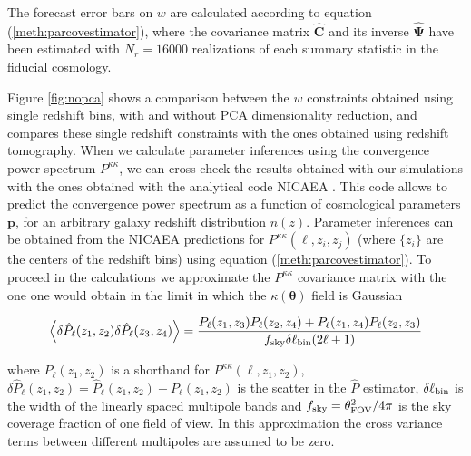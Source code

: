 \documentclass[reprint,aps,prd,superscriptaddress,showkeys,showpacs]{revtex4-1}
\newcommand{\bb}[1]{\mathbf{#1}}
\newcommand{\bbh}[1]{\mathbf{\hat{#1}}}
\newcommand{\h}[1]{\hat{#1}}
\begin{document}
The forecast error bars on $w$ are calculated according to equation (\ref{meth:parcovestimator}), where the covariance matrix $\bbh{C}$ and its inverse $\bbh{\Psi}$ have been estimated with $N_r=16000$ realizations of each summary statistic in the fiducial cosmology.

Figure \ref{fig:nopca} shows a comparison between the $w$ constraints obtained using single redshift bins, with and without PCA dimensionality reduction, and compares these single redshift constraints with the ones obtained using redshift tomography. When we calculate parameter inferences using the convergence power spectrum $P^{\kappa\kappa}$, we can cross check the results obtained with our simulations with the ones obtained with the analytical code NICAEA \citep{Nicaea}. This code allows to predict the convergence power spectrum as a function of cosmological parameters $\bb{p}$, for an arbitrary galaxy redshift distribution $n(z)$. Parameter inferences can be obtained from the NICAEA predictions for $P^{\kappa\kappa}(\ell,z_i,z_j)$ (where $\{z_i\}$ are the centers of the redshift bins) using equation (\ref{meth:parcovestimator}). To proceed in the calculations we approximate the $P^{\kappa\kappa}$ covariance matrix with the one one would obtain in the limit in which the $\kappa(\pmb{\theta})$ field is Gaussian

\begin{widetext}
\begin{equation}
\label{meth:gausspcov}
\left\langle\delta\h{P}_\ell(z_1,z_2)\delta\h{P}_\ell(z_3,z_4)\right\rangle = \frac{P_\ell(z_1,z_3)P_\ell(z_2,z_4)+P_\ell(z_1,z_4)P_\ell(z_2,z_3)}{f_{\rm sky}\delta\ell_{\rm bin}(2\ell+1)}
\end{equation} 
\end{widetext}
%
where $P_\ell(z_1,z_2)$ is a shorthand for $P^{\kappa\kappa}(\ell,z_1,z_2)$, $\delta\h{P}_\ell(z_1,z_2)=\h{P}_\ell(z_1,z_2) - P_\ell(z_1,z_2)$ is the scatter in the $\h{P}$ estimator, $\delta\ell_{\rm bin}$ is the width of the linearly spaced multipole bands and $f_{\rm sky} = \theta^2_{\rm FOV}/4\pi$ is the sky coverage fraction of one field of view. In this approximation the cross variance terms between different multipoles are assumed to be zero.   
\end{document}
